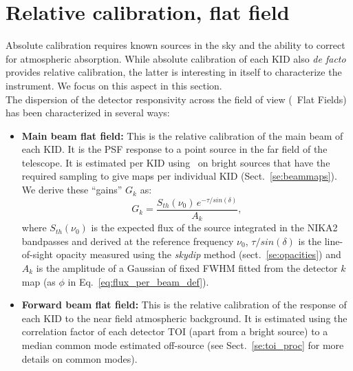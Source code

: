 

\section{Relative calibration, flat field}%
\label{se:flatfields}

Absolute calibration requires known sources in the sky and the ability to
correct for atmospheric absorption. While absolute calibration of each KID also
\emph{de facto} provides relative calibration, the latter is interesting in
itself to characterize the instrument. We focus on this aspect in this section.\\

The dispersion of the detector responsivity across the field of view (\aka\ Flat
Fields) has been characterized in several ways:

\begin{itemize}
\item {\bf Main beam flat field:} This is the relative calibration of the main
  beam of each KID. It is the PSF response to a point source in the far field of the
  telescope. It is estimated per KID using \bms\ on bright sources that have the
  required sampling to give maps per individual KID (Sect.~\ref{se:beammaps}). We
  derive these ``gains'' $G_k$ as:
  \begin{equation}
    G_k = \frac{S_{th}(\nu_0)\, e^{-\tau/sin(\delta)}}{A_k}, 
  \end{equation}
  where $S_{th}(\nu_0)$ is the expected flux of the source integrated in the
  NIKA2 bandpasses and derived at the reference frequency $\nu_0$, 
  $\tau/sin(\delta)$ is the line-of-sight opacity measured using the
  \emph{skydip} method (sect.~\ref{se:opacities}) and $A_k$ is the
  amplitude of a Gaussian of fixed FWHM fitted from the detector $k$ map (as
  $\phi$ in Eq.~\ref{eq:flux_per_beam_def}).
\item {\bf Forward beam flat field:} This is the relative calibration of the response of
  each KID to the near field atmospheric background. It is estimated
  using the correlation factor of each detector TOI (apart from a bright source)
  to a median common mode estimated off-source (see Sect.~\ref{se:toi_proc} for
  more details on common modes).
\end{itemize}

